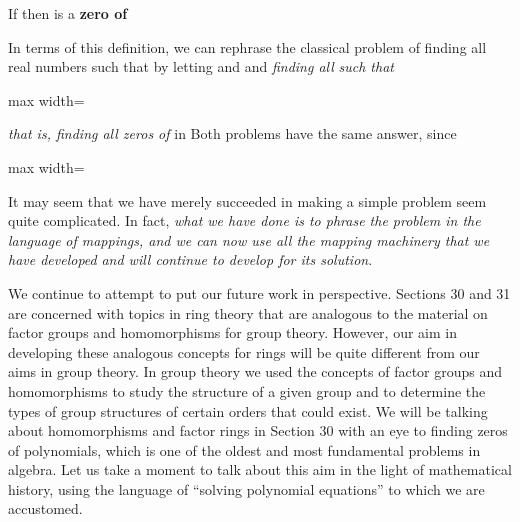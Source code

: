 \documentclass[11pt,oneside]{article}
\begin{document}
\begin{BookBody}
\noindent If  then \BookInline{\alpha } is a\textbf{ zero of}  \BookEnd{\blacksquare}

In terms of this definition, we can rephrase the classical problem of finding all real numbers  such that  by letting  and  and\textit{ finding all}  \textit{such that}

\begin{center}\begin{adjustbox}{max width=\linewidth}\end{adjustbox}\end{center}

\noindent \textit{that is, finding all zeros of}  in  Both problems have the same answer, since

\begin{center}\begin{adjustbox}{max width=\linewidth}\end{adjustbox}\end{center}

It may seem that we have merely succeeded in making a simple problem seem quite complicated. In fact,\textit{ what we have done is to phrase the problem in the language} \textit{of mappings, and we can now use all the mapping machinery that we have developed} \textit{and will continue to develop for its solution}.


\noindent We continue to attempt to put our future work in perspective. Sections 30 and 31 are concerned with topics in ring theory that are analogous to the material on factor groups and homomorphisms for group theory. However, our aim in developing these analogous concepts for rings will be quite different from our aims in group theory. In group theory we used the concepts of factor groups and homomorphisms to study the structure of a given group and to determine the types of group structures of certain orders that could exist. We will be talking about homomorphisms and factor rings in Section 30 with an eye to finding zeros of polynomials, which is one of the oldest and most fundamental problems in algebra. Let us take a moment to talk about this aim in the light of mathematical history, using the language of “solving polynomial equations” to which we are accustomed.


\end{BookBody}
\end{document}
